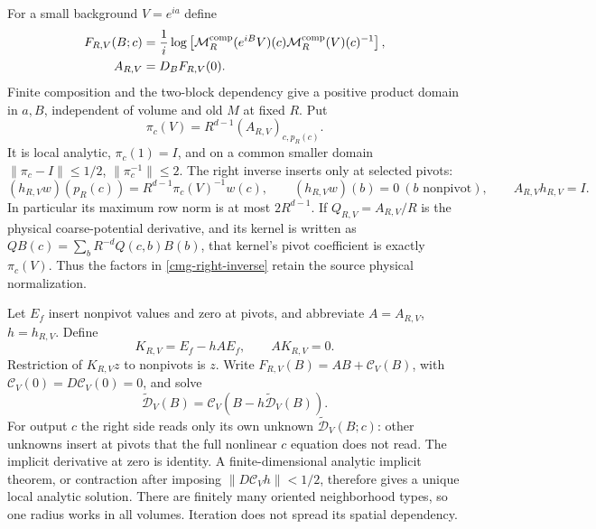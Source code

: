 For a small background $V=e^{ia}$ define
\begin{align}
 F_{R,V}(B;c)&=\frac1i\log\left[
 \mathcal M_R^{\mathrm{comp}}(e^{iB}V)(c)
 \mathcal M_R^{\mathrm{comp}}(V)(c)^{-1}\right],\notag\\
 A_{R,V}&=D_BF_{R,V}(0).
 \label{cmg-relative-map}
\end{align}
Finite composition and the two-block dependency give a positive
product domain in $a,B$, independent of volume and old $M$ at fixed
$R$. Put
\begin{equation}
 \pi_c(V)=R^{d-1}(A_{R,V})_{c,p_R(c)}.
 \label{cmg-pi}
\end{equation}
It is local analytic, $\pi_c(1)=I$, and on a common smaller domain
$\lVert\pi_c-I\rVert\le1/2$, $\lVert\pi_c^{-1}\rVert\le2$.
The right inverse inserts only at selected pivots:
\begin{equation}
 (h_{R,V}w)(p_R(c))=R^{d-1}\pi_c(V)^{-1}w(c),\qquad
 (h_{R,V}w)(b)=0\ (b\text{ nonpivot}),\qquad A_{R,V}h_{R,V}=I.
 \label{cmg-right-inverse}
\end{equation}
In particular its maximum row norm is at most $2R^{d-1}$.
If $Q_{R,V}=A_{R,V}/R$ is the physical coarse-potential derivative,
and its kernel is written as
$QB(c)=\sum_bR^{-d}Q(c,b)B(b)$, that kernel's pivot coefficient
is exactly $\pi_c(V)$. Thus the factors in
\eqref{cmg-right-inverse} retain the source physical normalization.

Let $E_f$ insert nonpivot values and zero at pivots, and abbreviate
$A=A_{R,V}$, $h=h_{R,V}$. Define
\begin{equation}
 K_{R,V}=E_f-hAE_f,\qquad AK_{R,V}=0.
 \label{cmg-insertion}
\end{equation}
Restriction of $K_{R,V}z$ to nonpivots is $z$. Write
$F_{R,V}(B)=AB+\mathcal C_V(B)$, with
$\mathcal C_V(0)=D\mathcal C_V(0)=0$, and solve
\begin{equation}
 \widetilde{\mathcal D}_V(B)
       =\mathcal C_V(B-h\widetilde{\mathcal D}_V(B)).
 \label{cmg-implicit-correction}
\end{equation}
For output $c$ the right side reads only its own unknown
$\widetilde{\mathcal D}_V(B;c)$: other unknowns insert at pivots that
the full nonlinear $c$ equation does not read. The implicit derivative
at zero is identity. A finite-dimensional analytic implicit theorem,
or contraction after imposing $\lVert D\mathcal C_V h\rVert<1/2$,
therefore gives a unique local analytic solution. There are finitely
many oriented neighborhood types, so one radius works in all volumes.
Iteration does not spread its spatial dependency.

